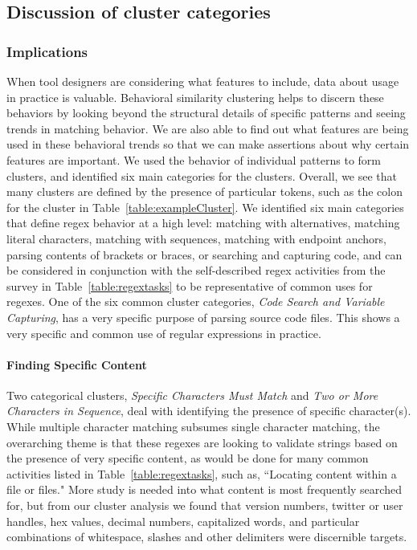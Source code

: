 \subsection{Discussion of cluster categories}
\subsubsection{Implications}
When tool designers are considering what features to include, data about usage in practice is valuable.  Behavioral similarity clustering  helps to discern these behaviors by looking beyond the structural details of specific patterns and seeing trends in  matching behavior. We are also able to find out what features are being used in these behavioral trends so that we can make assertions about why certain features are important.
We used the behavior of individual patterns to form clusters, and identified six main categories for the clusters.
 Overall, we see that many clusters are defined by the presence of particular tokens, such as the colon for the cluster in Table~\ref{table:exampleCluster}.
We identified six main categories that define regex behavior at a high level: matching with alternatives, matching literal characters, matching with sequences, matching with endpoint anchors, parsing contents of brackets or braces, or searching and capturing code, and can be considered in conjunction with the self-described regex activities from the survey in Table~\ref{table:regextasks} to be representative of common uses for regexes.
One of the six common cluster categories, \emph{Code Search and Variable Capturing}, has a very specific purpose of parsing source code files. This shows a very specific and common use of regular expressions in practice.

\paragraph{Finding Specific Content}
Two categorical clusters, \emph{Specific Characters Must Match} and \emph{Two or More Characters in Sequence}, deal with identifying the presence of specific character(s).
While multiple character matching subsumes single character matching, the overarching theme is that these regexes are looking to validate strings based on the presence of very specific content, as would be done for many common activities listed in Table~\ref{table:regextasks}, such as, ``Locating content within a file or files."
More study is needed into what content is most frequently searched for, but from our cluster analysis we found that version numbers, twitter or user handles, hex values, decimal numbers, capitalized words, and particular combinations of whitespace, slashes and other delimiters were discernible targets.

